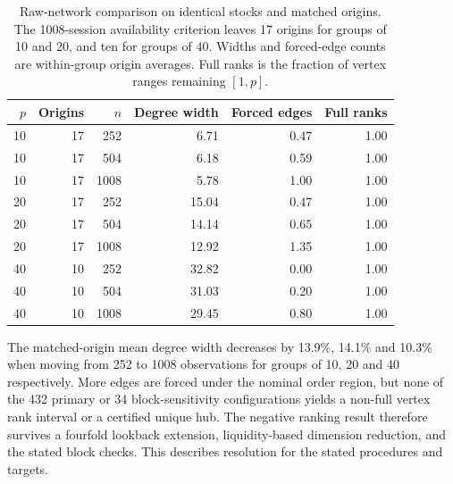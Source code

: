 \begin{table}[htbp]
\caption{Raw-network comparison on identical stocks and matched origins. The 1008-session availability criterion leaves 17 origins for groups of 10 and 20, and ten for groups of 40. Widths and forced-edge counts are within-group origin averages. Full ranks is the fraction of vertex ranges remaining $[1,p]$.}\label{tab:extended}
\centering\small
\begin{tabular}{rrrrrr}
\toprule
$p$ & Origins & $n$ & Degree width & Forced edges & Full ranks \\
\midrule
10 & 17 & 252 & 6.71 & 0.47 & 1.00 \\
10 & 17 & 504 & 6.18 & 0.59 & 1.00 \\
10 & 17 & 1008 & 5.78 & 1.00 & 1.00 \\
20 & 17 & 252 & 15.04 & 0.47 & 1.00 \\
20 & 17 & 504 & 14.14 & 0.65 & 1.00 \\
20 & 17 & 1008 & 12.92 & 1.35 & 1.00 \\
40 & 10 & 252 & 32.82 & 0.00 & 1.00 \\
40 & 10 & 504 & 31.03 & 0.20 & 1.00 \\
40 & 10 & 1008 & 29.45 & 0.80 & 1.00 \\
\bottomrule
\end{tabular}
\end{table}
The matched-origin mean degree width decreases by 13.9\%, 14.1\% and 10.3\% when moving from 252 to 1008 observations for groups of 10, 20 and 40 respectively. More edges are forced under the nominal order region, but none of the 432 primary or 34 block-sensitivity configurations yields a non-full vertex rank interval or a certified unique hub. The negative ranking result therefore survives a fourfold lookback extension, liquidity-based dimension reduction, and the stated block checks. This describes resolution for the stated procedures and targets.

